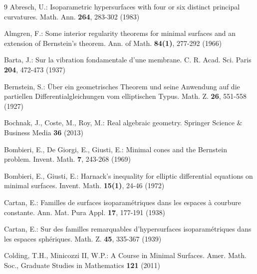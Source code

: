 \documentclass[pdflatex,sn-mathphys-num]{sn-jnl}%
\theoremstyle{thmstyleone}%
\theoremstyle{thmstyletwo}%
\theoremstyle{thmstylethree}%
\begin{document}


\begin{thebibliography}{9}
	Abresch, U.: Isoparametric hypersurfaces with four or six distinct principal curvatures. Math. Ann. \textbf{264}, 283-302 (1983)
	
	Almgren, F.: Some interior regularity theorems for minimal surfaces and an extension of Bernstein's theorem. Ann. of Math. \textbf{84(1)}, 277-292 (1966)
	
	
	Barta, J.: Sur la vibration fondamentale d'une membrane. C. R. Acad. Sci. Paris \textbf{204}, 472-473 (1937)
	
	Bernstein, S.: \"Uber ein geometrisches Theorem und seine Anwendung auf die partiellen Differentialgleichungen vom elliptischen Typus. Math. Z. \textbf{26}, 551-558 (1927)
	
	Bochnak, J., Coste, M., Roy, M.: Real algebraic geometry. Springer Science \& Business Media \textbf{36} (2013)
	
	Bombieri, E., De Giorgi, E., Giusti, E.: Minimal cones and the Bernstein problem. Invent. Math. \textbf{7}, 243-268 (1969)
	
	Bombieri, E., Giusti, E.: Harnack's inequality for elliptic differential equations on minimal surfaces. Invent. Math. \textbf{15(1)}, 24-46 (1972)
	
	Cartan, E.: Familles de surfaces isoparam\'etriques dans les espaces \`a courbure constante. Ann. Mat. Pura Appl. \textbf{17}, 177-191 (1938)
	
	Cartan, E.: Sur des familles remarquables d'hypersurfaces isoparam\'etriques dans les espaces sph\'eriques. Math. Z. \textbf{45}, 335-367 (1939)

    
	Colding, T.H., Minicozzi II, W.P.: A Course in Minimal Surfaces. Amer. Math. Soc., Graduate Studies in Mathematics \textbf{121} (2011)
	

\end{thebibliography}
\end{document}
